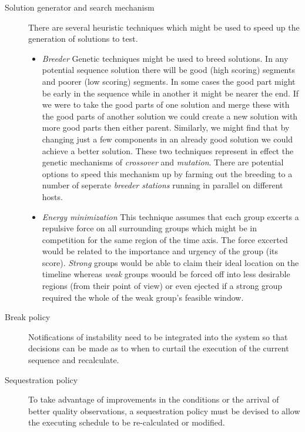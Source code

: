 \begin{description}

 \item [Solution generator and search mechanism]
There are several heuristic techniques which might be used to speed up the generation of solutions to test.

\begin{itemize}
\item \emph{Breeder} Genetic techniques might be used to breed solutions. In any potential sequence solution there will be good (high scoring) segments and poorer (low scoring) segments. In some cases the good part might be early in the sequence while in another it might be nearer the end. If we were to take the good parts of one solution and merge these with the good parts of another solution we could create a new solution with more good parts then either parent. Similarly, we might find that by changing just a few components in an already good solution we could achieve a better solution. These two techniques represent in effect the genetic mechanisms of \emph{crossover} and \emph{mutation}. There are potential options to speed this mechanism up by farming out the breeding to a number of seperate \emph{breeder stations} running in parallel on different hosts.

\item \emph{Energy minimization} This technique assumes that each group excerts a repulsive force on all surrounding groups which might be in competition for the same region of the time axis. The force excerted would be related to the importance and urgency of the group (its score). \emph{Strong} groups would be able to claim their ideal location on the timeline whereas \emph{weak} groups woould be forced off into less desirable regions (from their point of view) or even ejected if a strong group required the whole of the weak group's feasible window.

\end{itemize}

 \item [Break policy]
Notifications of instability need to be integrated into the system so that decisions can be made as to when to curtail the execution of the current sequence and recalculate.

 \item [Sequestration policy]
To take advantage of improvements in the conditions or the arrival of better quality observations, a sequestration policy must be devised to allow the executing schedule to be re-calculated or modified.


\end{description}
